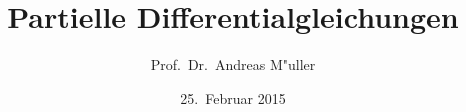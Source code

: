 \documentclass{beamer}
\title[]{Partielle Differentialgleichungen}
\date[25.~Februar 2015]{25.~Februar 2015}
\author{Prof.~Dr.~Andreas M"uller}
\begin{document}
\begin{frame}
\titlepage
\end{frame}
\end{document}
